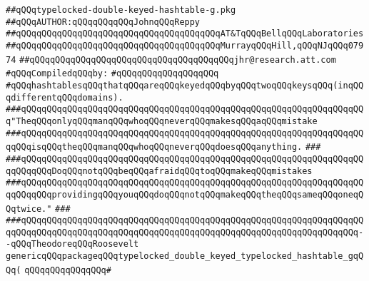 \label{src/lib/src/typelocked-double-keyed-hashtable-g.pkg}
\verb|##qQQqtypelocked-double-keyed-hashtable-g.pkg|\newline
\verb|##qQQqAUTHOR:qQQqqQQqqQQqJohnqQQqReppy|\newline
\verb|##qQQqqQQqqQQqqQQqqQQqqQQqqQQqqQQqqQQqqQQqAT&TqQQqBellqQQqLaboratories|\newline
\verb|##qQQqqQQqqQQqqQQqqQQqqQQqqQQqqQQqqQQqqQQqMurrayqQQqHill,qQQqNJqQQq07974|\newline
\verb|##qQQqqQQqqQQqqQQqqQQqqQQqqQQqqQQqqQQqqQQqjhr@research.att.com|\newline
\newline
\verb|#qQQqCompiledqQQqby:|\newline
\verb|#qQQqqQQqqQQqqQQqqQQq|\newline
\newline
\verb|#qQQqhashtablesqQQqthatqQQqareqQQqkeyedqQQqbyqQQqtwoqQQqkeysqQQq(inqQQqdifferentqQQqdomains).|\newline
\newline
\newline
\verb|###qQQqqQQqqQQqqQQqqQQqqQQqqQQqqQQqqQQqqQQqqQQqqQQqqQQqqQQqqQQqqQQqqQQq"TheqQQqonlyqQQqmanqQQqwhoqQQqneverqQQqmakesqQQqaqQQqmistake|\newline
\verb|###qQQqqQQqqQQqqQQqqQQqqQQqqQQqqQQqqQQqqQQqqQQqqQQqqQQqqQQqqQQqqQQqqQQqqQQqisqQQqtheqQQqmanqQQqwhoqQQqneverqQQqdoesqQQqanything.|\newline
\verb|###|\newline
\verb|###qQQqqQQqqQQqqQQqqQQqqQQqqQQqqQQqqQQqqQQqqQQqqQQqqQQqqQQqqQQqqQQqqQQqqQQqqQQqDoqQQqnotqQQqbeqQQqafraidqQQqtoqQQqmakeqQQqmistakes|\newline
\verb|###qQQqqQQqqQQqqQQqqQQqqQQqqQQqqQQqqQQqqQQqqQQqqQQqqQQqqQQqqQQqqQQqqQQqqQQqqQQqprovidingqQQqyouqQQqdoqQQqnotqQQqmakeqQQqtheqQQqsameqQQqoneqQQqtwice."|\newline
\verb|###|\newline
\verb|###qQQqqQQqqQQqqQQqqQQqqQQqqQQqqQQqqQQqqQQqqQQqqQQqqQQqqQQqqQQqqQQqqQQqqQQqqQQqqQQqqQQqqQQqqQQqqQQqqQQqqQQqqQQqqQQqqQQqqQQqqQQqqQQqqQQqqQQq--qQQqTheodoreqQQqRoosevelt|\newline
\newline
\newline
\newline
\verb|genericqQQqpackageqQQqtypelocked_double_keyed_typelocked_hashtable_gqQQq(|\newline
\verb|qQQqqQQqqQQqqQQq#|\newline
